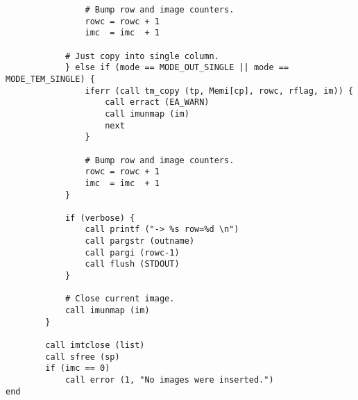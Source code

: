 \begin{verbatim}
                # Bump row and image counters.
                rowc = rowc + 1
                imc  = imc  + 1

            # Just copy into single column.
            } else if (mode == MODE_OUT_SINGLE || mode == MODE_TEM_SINGLE) {
                iferr (call tm_copy (tp, Memi[cp], rowc, rflag, im)) {
                    call erract (EA_WARN)
                    call imunmap (im)
                    next
                }

                # Bump row and image counters.
                rowc = rowc + 1
                imc  = imc  + 1
            }

            if (verbose) {
                call printf ("-> %s row=%d \n")
                call pargstr (outname)
                call pargi (rowc-1)
                call flush (STDOUT)
            }

            # Close current image.
            call imunmap (im)
        }

        call imtclose (list)
        call sfree (sp)
        if (imc == 0)
            call error (1, "No images were inserted.")
end
\end{verbatim}
\newpage
{}
